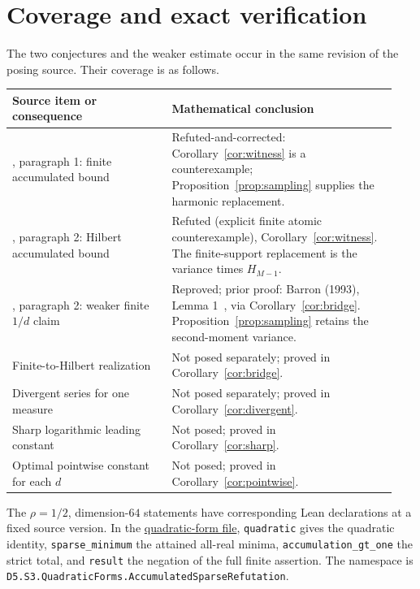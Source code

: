 \documentclass[11pt]{article}
\begin{document}
\section{Coverage and exact verification}
The two conjectures and the weaker estimate occur in the same revision of
the posing source. Their coverage is as follows.
\begin{center}
\begin{tabular}{@{}>{\raggedright\arraybackslash}p{0.39\linewidth}>{\raggedright\arraybackslash}p{0.55\linewidth}@{}}
\toprule
Source item or consequence & Mathematical conclusion\\
\midrule
\cite{ekene}, paragraph 1: finite accumulated bound &
Refuted-and-corrected: Corollary~\ref{cor:witness} is a counterexample;
Proposition~\ref{prop:sampling} supplies the harmonic replacement.\\[3pt]
\cite{ekene}, paragraph 2: Hilbert accumulated bound &
Refuted (explicit finite atomic counterexample), Corollary~\ref{cor:witness}.
The finite-support replacement is the variance times $H_{M-1}$.\\[3pt]
\cite{ekene}, paragraph 2: weaker finite $1/d$ claim &
Reproved; prior proof: Barron (1993), Lemma 1~\cite{barron1993},
via Corollary~\ref{cor:bridge}. Proposition~\ref{prop:sampling} retains the
second-moment variance.\\[3pt]
Finite-to-Hilbert realization & Not posed separately; proved in
Corollary~\ref{cor:bridge}.\\[3pt]
Divergent series for one measure & Not posed separately; proved in
Corollary~\ref{cor:divergent}.\\[3pt]
Sharp logarithmic leading constant & Not posed; proved in
Corollary~\ref{cor:sharp}.\\[3pt]
Optimal pointwise constant for each $d$ & Not posed; proved in
Corollary~\ref{cor:pointwise}.\\
\bottomrule
\end{tabular}
\end{center}

The $\rho=1/2$, dimension-$64$ statements have corresponding Lean declarations at a
fixed source version. In the
\href{https://github.com/the-omega-institute/trureturing/blob/88be2a120b67a9d9e724eaae970c8263d0a0e9a4/D5/S3/QuadraticForms/AccumulatedSparseRefutation.lean}{quadratic-form file},
\texttt{quadratic} gives the quadratic identity,
\texttt{sparse\_minimum} the attained all-real minima,
\texttt{accumulation\_gt\_one} the strict total, and
\texttt{result} the negation of the full finite assertion. The namespace is
\texttt{D5.S3.QuadraticForms.\allowbreak AccumulatedSparseRefutation}.
\end{document}
